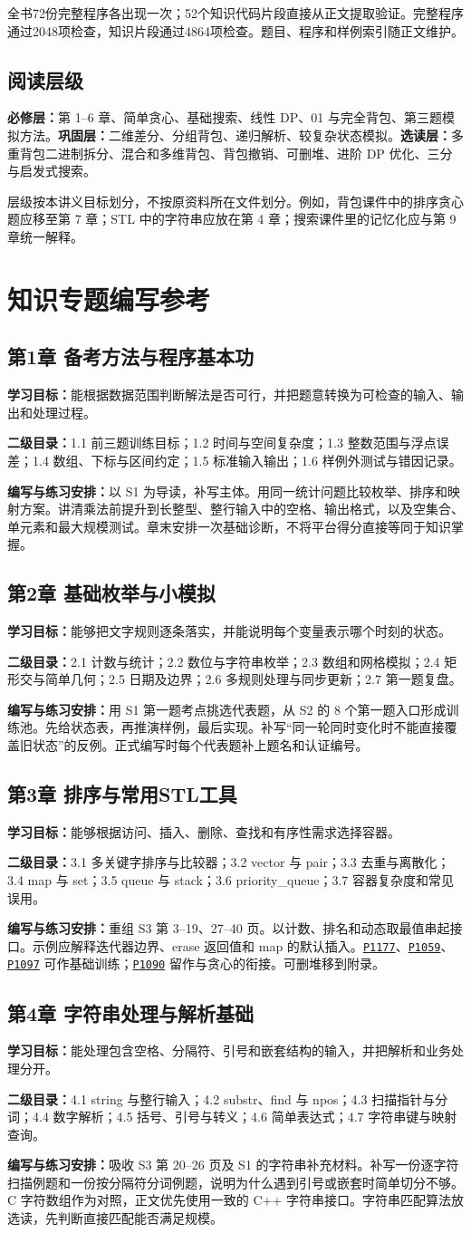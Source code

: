 \documentclass[UTF8,11pt,a4paper,fontset=none]{ctexart}
\newcommand{\prob}[1]{\href{https://www.luogu.com.cn/problem/#1}{\texttt{#1}}}
\newcommand{\topic}[4]{\subsection{#1}\textbf{学习目标：}#2\par\textbf{二级目录：}#3\par\textbf{编写与练习安排：}#4\par}
\begin{document}
全书72份完整程序各出现一次；52个知识代码片段直接从正文提取验证。完整程序通过2048项检查，知识片段通过4864项检查。题目、程序和样例索引随正文维护。

\subsection{阅读层级}
\textbf{必修层：}第 1--6 章、简单贪心、基础搜索、线性 DP、01 与完全背包、第三题模拟方法。\textbf{巩固层：}二维差分、分组背包、递归解析、较复杂状态模拟。\textbf{选读层：}多重背包二进制拆分、混合和多维背包、背包撤销、可删堆、进阶 DP 优化、三分与启发式搜索。

层级按本讲义目标划分，不按原资料所在文件划分。例如，背包课件中的排序贪心题应移至第 7 章；STL 中的字符串应放在第 4 章；搜索课件里的记忆化应与第 9 章统一解释。

\section{知识专题编写参考}
\topic{第1章 备考方法与程序基本功}
{能根据数据范围判断解法是否可行，并把题意转换为可检查的输入、输出和处理过程。}
{1.1 前三题训练目标；1.2 时间与空间复杂度；1.3 整数范围与浮点误差；1.4 数组、下标与区间约定；1.5 标准输入输出；1.6 样例外测试与错因记录。}
{以 S1 为导读，补写主体。用同一统计问题比较枚举、排序和映射方案。讲清乘法前提升到长整型、整行输入中的空格、输出格式，以及空集合、单元素和最大规模测试。章末安排一次基础诊断，不将平台得分直接等同于知识掌握。}

\topic{第2章 基础枚举与小模拟}
{能够把文字规则逐条落实，并能说明每个变量表示哪个时刻的状态。}
{2.1 计数与统计；2.2 数位与字符串枚举；2.3 数组和网格模拟；2.4 矩形交与简单几何；2.5 日期及边界；2.6 多规则处理与同步更新；2.7 第一题复盘。}
{用 S1 第一题考点挑选代表题，从 S2 的 8 个第一题入口形成训练池。先给状态表，再推演样例，最后实现。补写“同一轮同时变化时不能直接覆盖旧状态”的反例。正式编写时每个代表题补上题名和认证编号。}

\topic{第3章 排序与常用STL工具}
{能够根据访问、插入、删除、查找和有序性需求选择容器。}
{3.1 多关键字排序与比较器；3.2 vector 与 pair；3.3 去重与离散化；3.4 map 与 set；3.5 queue 与 stack；3.6 priority\_queue；3.7 容器复杂度和常见误用。}
{重组 S3 第 3--19、27--40 页。以计数、排名和动态取最值串起接口。示例应解释迭代器边界、erase 返回值和 map 的默认插入。\prob{P1177}、\prob{P1059}、\prob{P1097} 可作基础训练；\prob{P1090} 留作与贪心的衔接。可删堆移到附录。}

\topic{第4章 字符串处理与解析基础}
{能处理包含空格、分隔符、引号和嵌套结构的输入，并把解析和业务处理分开。}
{4.1 string 与整行输入；4.2 substr、find 与 npos；4.3 扫描指针与分词；4.4 数字解析；4.5 括号、引号与转义；4.6 简单表达式；4.7 字符串键与映射查询。}
{吸收 S3 第 20--26 页及 S1 的字符串补充材料。补写一份逐字符扫描例题和一份按分隔符分词例题，说明为什么遇到引号或嵌套时简单切分不够。C 字符数组作为对照，正文优先使用一致的 C++ 字符串接口。字符串匹配算法放选读，先判断直接匹配能否满足规模。}
\end{document}
